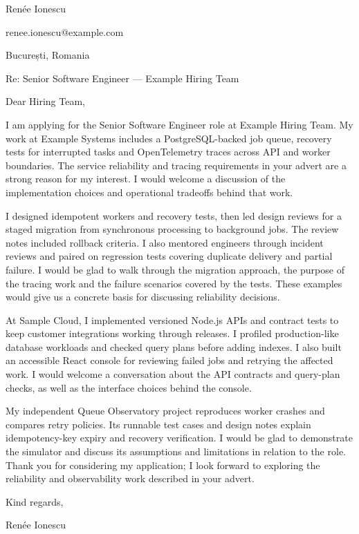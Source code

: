 \documentclass[11pt,a4paper]{article}
\begin{document}
Renée Ionescu\par

renee.ionescu@example.com\par

București, Romania\par

Re: Senior Software Engineer — Example Hiring Team\par

Dear Hiring Team,\par

I am applying for the Senior Software Engineer role at Example Hiring Team. My work at Example Systems includes a PostgreSQL-backed job queue, recovery tests for interrupted tasks and OpenTelemetry traces across API and worker boundaries. The service reliability and tracing requirements in your advert are a strong reason for my interest. I would welcome a discussion of the implementation choices and operational tradeoffs behind that work.\par

I designed idempotent workers and recovery tests, then led design reviews for a staged migration from synchronous processing to background jobs. The review notes included rollback criteria. I also mentored engineers through incident reviews and paired on regression tests covering duplicate delivery and partial failure. I would be glad to walk through the migration approach, the purpose of the tracing work and the failure scenarios covered by the tests. These examples would give us a concrete basis for discussing reliability decisions.\par

At Sample Cloud, I implemented versioned Node.js APIs and contract tests to keep customer integrations working through releases. I profiled production-like database workloads and checked query plans before adding indexes. I also built an accessible React console for reviewing failed jobs and retrying the affected work. I would welcome a conversation about the API contracts and query-plan checks, as well as the interface choices behind the console.\par

My independent Queue Observatory project reproduces worker crashes and compares retry policies. Its runnable test cases and design notes explain idempotency-key expiry and recovery verification. I would be glad to demonstrate the simulator and discuss its assumptions and limitations in relation to the role. Thank you for considering my application; I look forward to exploring the reliability and observability work described in your advert.\par

Kind regards,\par

Renée Ionescu
\par
\end{document}
